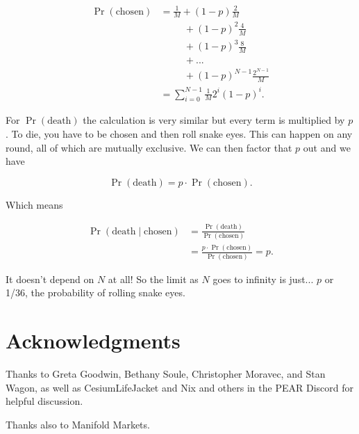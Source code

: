 \documentclass[article,twocolumn]{memoir}
\begin{document}
\begin{equation}
\begin{split}
\Pr(\text{chosen}) & = \tfrac{1}{M} + (1-p)\tfrac{2}{M} \\
& \phantom{mmii} + (1-p)^2\tfrac{4}{M} \\
& \phantom{mmii} + (1-p)^3\tfrac{8}{M} \\
& \phantom{mmii} + ... \\
& \phantom{mmii} + (1-p)^{N-1}\frac{2^{N-1}}{M} \\
& = \sum_{i=0}^{N-1} \tfrac{1}{M} 2^i(1-p)^i.
\end{split}
\end{equation}

For $\Pr(\text{death})$ the calculation is very similar but every term is multiplied by $p$.
To die, you have to be chosen and then roll snake eyes.
This can happen on any round, all of which are mutually exclusive.
We can then factor that $p$ out and we have

$$
\Pr(\text{death}) = p\cdot\Pr(\text{chosen}).
$$

Which means

\begin{equation}
\begin{split}
\Pr(\text{death} \mid \text{chosen}) & = 
\frac{\Pr(\text{death})}{\Pr(\text{chosen})} \\
& = \frac{p\cdot\Pr(\text{chosen})}{\Pr(\text{chosen})} = 
p.
\end{split}
\end{equation}

It doesn't depend on $N$ at all!
So the limit as $N$ goes to infinity is just... 
$p$ or 1/36, the probability of rolling snake eyes.
\qedsymbol{}


\chapter*{Acknowledgments}

Thanks to 
Greta Goodwin, 
Bethany Soule, 
Christopher Moravec,
and Stan Wagon, as well as
CesiumLifeJacket and Nix and others in the PEAR Discord for helpful discussion.

Thanks also to Manifold Markets.
\end{document}
